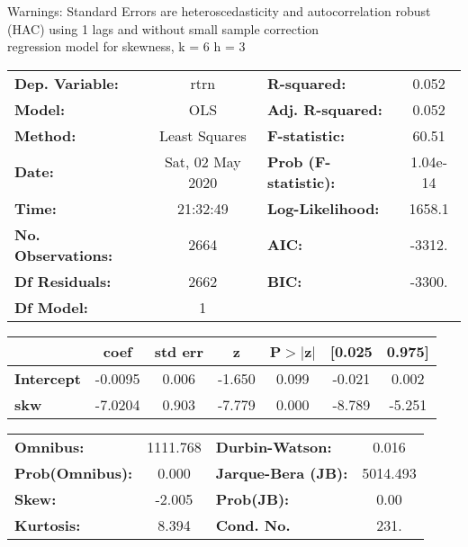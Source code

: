 Warnings: \newline
 [1] Standard Errors are heteroscedasticity and autocorrelation robust (HAC) using 1 lags and without small sample correction\\ 

regression model for skewness, k = 6 h = 3\begin{center}
\begin{tabular}{lclc}
\toprule
\textbf{Dep. Variable:}    &       rtrn       & \textbf{  R-squared:         } &     0.052   \\
\textbf{Model:}            &       OLS        & \textbf{  Adj. R-squared:    } &     0.052   \\
\textbf{Method:}           &  Least Squares   & \textbf{  F-statistic:       } &     60.51   \\
\textbf{Date:}             & Sat, 02 May 2020 & \textbf{  Prob (F-statistic):} &  1.04e-14   \\
\textbf{Time:}             &     21:32:49     & \textbf{  Log-Likelihood:    } &    1658.1   \\
\textbf{No. Observations:} &        2664      & \textbf{  AIC:               } &    -3312.   \\
\textbf{Df Residuals:}     &        2662      & \textbf{  BIC:               } &    -3300.   \\
\textbf{Df Model:}         &           1      & \textbf{                     } &             \\
\bottomrule
\end{tabular}
\begin{tabular}{lcccccc}
                   & \textbf{coef} & \textbf{std err} & \textbf{z} & \textbf{P$> |$z$|$} & \textbf{[0.025} & \textbf{0.975]}  \\
\midrule
\textbf{Intercept} &      -0.0095  &        0.006     &    -1.650  &         0.099        &       -0.021    &        0.002     \\
\textbf{skw}       &      -7.0204  &        0.903     &    -7.779  &         0.000        &       -8.789    &       -5.251     \\
\bottomrule
\end{tabular}
\begin{tabular}{lclc}
\textbf{Omnibus:}       & 1111.768 & \textbf{  Durbin-Watson:     } &    0.016  \\
\textbf{Prob(Omnibus):} &   0.000  & \textbf{  Jarque-Bera (JB):  } & 5014.493  \\
\textbf{Skew:}          &  -2.005  & \textbf{  Prob(JB):          } &     0.00  \\
\textbf{Kurtosis:}      &   8.394  & \textbf{  Cond. No.          } &     231.  \\
\bottomrule
\end{tabular}
\end{center}

